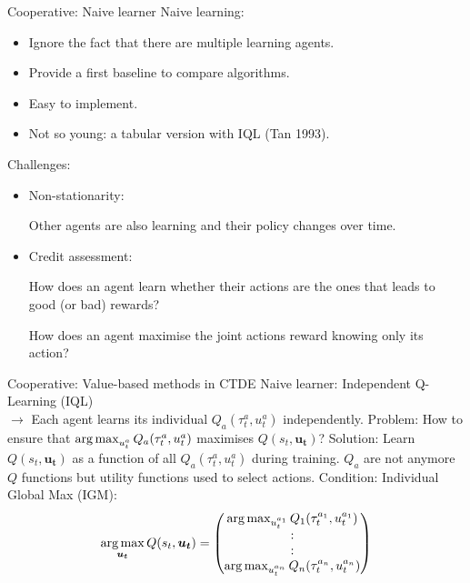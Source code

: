 \documentclass[9pt, hyperref={pdfusetitle,colorlinks=true,allcolors=DarkBlue}]{beamer}
\begin{document}
\begin{frame}{Cooperative: Naive learner}
Naive learning:
\begin{itemize}
    \item Ignore the fact that there are multiple learning agents.
    \item Provide a first baseline to compare algorithms.
    \item Easy to implement.
    \item Not so young: a tabular version with IQL (Tan 1993).
\end{itemize}
\vfill
Challenges:
\pause
\begin{itemize}
\item Non-stationarity:

Other agents are also learning and their policy changes over time.

\item Credit assessment: 

How does an agent learn whether their actions are the ones that leads to good (or bad) rewards?

How does an agent maximise the joint actions reward knowing only its action?

\end{itemize}
\end{frame}

\begin{frame}{Cooperative: Value-based methods in CTDE}
Naive learner: Independent Q-Learning (IQL)\\
$\rightarrow$ Each agent learns its individual $Q_a(\tau^a_t, u^a_t)$ independently.
\vfill
Problem:
How to ensure that $\operatorname*{arg\,max}_{u^a_t} Q_a(\tau^a_t, u^a_t)$ maximises $Q(s_t, \bm{u_t})$?
\vfill
\pause
Solution: Learn $Q(s_t, \bm{u_t})$ as a function of all $Q_a(\tau^a_t, u^a_t)$ during training.
\vfill
$Q_a$ are not anymore $Q$ functions but utility functions used to select actions.
\vfill
Condition: Individual Global Max (IGM):
\begin{equation*}
    \operatorname*{arg\,max}_{\bm{u_t}} Q(s_t, \bm{u_t}) = 
    \begin{pmatrix}
    \operatorname*{arg\,max}_{u^{a_1}_t} Q_1(\tau^{a_1}_t, u^{a_1}_t) \\
    : \\
    : \\
    \operatorname*{arg\,max}_{u^{a_n}_t} Q_n(\tau^{a_n}_t, u^{a_n}_t)
    \end{pmatrix}
\end{equation*}

\end{frame}
\end{document}
